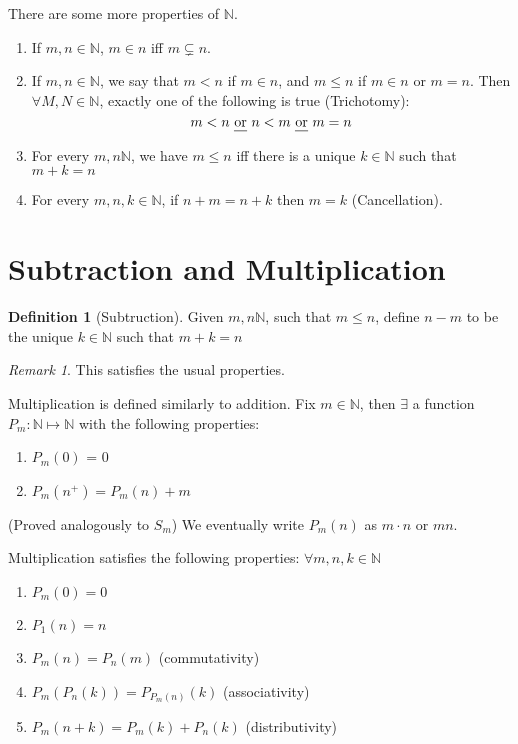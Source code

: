 \documentclass[12pt]{amsart}
\newcommand{\bbN}{\mathbb{N}}
\theoremstyle{plain}
\theoremstyle{remark}
\newtheorem*{rmk}{Remark}
\theoremstyle{definition}
\newtheorem*{define}{Definition}
\begin{document}
	\hfill
	\par
	There are some more properties of $\bbN$.
	\begin{enumerate}[(1)]
		\item 
		If $m, n \in \bbN$, $m \in n $ iff $m \subsetneq n$. 

		\item 
		If $m, n\in \bbN$, we say that $m < n$ if $m \in n$, and $m \leq n$ if $m \in n$ or $m = n$. Then $\forall M, N\in \bbN$, exactly one of the following is true  (Trichotomy):
		\begin{equation*}
			m < n \text{ \ul{or} } n < m \text{ \ul{or} } m = n
		\end{equation*}

		\item
		For every $m, n \bbN$, we have $m \leq n$ iff there is a unique $k \in \bbN$ such that $m+k = n$

		\item
		For every $m, n, k \in \bbN$, if $n+m = n+k$ then $m = k$ (Cancellation). 
	\end{enumerate}

\section*{Subtraction and Multiplication}

\begin{define}[Subtruction]
	Given $m, n \bbN$, such that $m \leq n$, define $n - m$ to be the unique $k\in \bbN$ such that $m + k = n$	
\end{define}

\begin{rmk}
	This satisfies the usual properties.
\end{rmk}

\hfill
\par
Multiplication is defined similarly to addition. Fix $m \in \bbN$, then $\exists$ a function $P_m:\bbN \mapsto \bbN$ with the following properties:
\begin{enumerate}[(1)]
	\item
		$P_m(0)$ = 0
	\item
		$P_m(n^+) = P_m(n) + m$
\end{enumerate}
(Proved analogously to $S_m$)
\newline
We eventually write $P_m(n)$ as $m \cdot n$ or $mn$.

\hfill
\par
Multiplication satisfies the following properties: $\forall m, n, k\in \bbN$
\begin{enumerate}
	\item 
		$P_m(0) = 0$
	\item
		$P_1(n) = n$
	\item
		$P_m(n) = P_n(m)$ (commutativity)
	\item
		$P_m\left( P_n(k) \right) = P_{P_m(n)}(k)$ (associativity)
	\item
		$P_m(n + k) = P_m(k) + P_n(k)$ (distributivity)
\end{enumerate}
\end{document}

